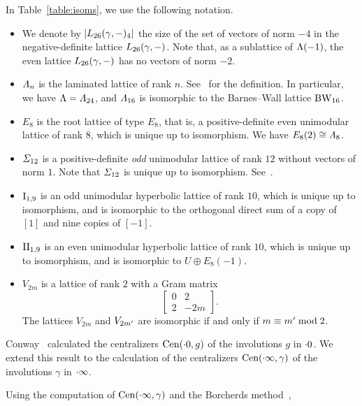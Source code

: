 \documentclass{amsart} %
\begin{document}
%
In Table~\ref{table:isoms}, we use the following notation.
\begin{itemize}
\item
We denote by $|L_{26}(\gamma, -)_4|$
the size of the set of vectors of norm $-4$ in the negative-definite lattice $L_{26}(\gamma, -)$.
Note that, as a sublattice of $\Lambda(-1)$, 
the even lattice $L_{26}(\gamma, -)$ has no vectors of norm $-2$.
\item 
$\varLambda_{n} $ is 
the laminated lattice of rank $n$. 
See~\cite[Chapter 6]{theCSbook} for the definition.
In particular, we have $\Lambda=\varLambda_{24}$, 
and  $\varLambda_{16}$ is isomorphic to the Barnes--Wall lattice $\mathrm{BW}_{16}$.
\item $E_8$ is the root lattice of type $E_8$, that is,
a positive-definite even unimodular lattice of rank $8$,
which is unique up to isomorphism.
We have $E_8(2)\cong \varLambda_{8}$.
\item $\varSigma_{12}$ is 
a positive-definite \emph{odd} unimodular lattice of rank $12$
without vectors of norm $1$.
Note that $\varSigma_{12}$ is unique up to isomorphism.
See~\cite[Table 16.7]{theCSbook}.
\item $\mathrm{I}_{1,9}$ is an odd unimodular hyperbolic lattice of rank $10$, 
which is unique up to isomorphism,
and is isomorphic to the orthogonal direct sum of
 a copy of $[1]$ and nine copies of $[-1]$.
 \item $\mathrm{II}_{1,9}$ is an even unimodular hyperbolic lattice of rank $10$,
 which is unique up to isomorphism,
 and is isomorphic to $U\oplus E_8(-1)$.
\item $V_{2m}$ is a lattice of rank $2$
with a Gram matrix 
%
\begin{equation}\label{eq:GramVm}
\left[\begin{array}{cc} 0&2 \\ 2 & -2m \end{array}\right].
\end{equation}
%
The lattices $V_{2m}$ and $V_{2m^{\prime}}$ are isomorphic 
if and only if $m\equiv m^{\prime} \bmod 2$.
\end{itemize}
%
\par
\medskip
Conway~\cite[Chapter 10]{theCSbook} calculated the centralizers $\mathrm{Cen}(\cdot 0, g)$
of the involutions $g$ in $\cdot 0$.
We extend this result to the calculation of the centralizers $\mathrm{Cen}(\cdot \infty, \gamma)$
of the involutions $\gamma$ in $\cdot \infty$.
\par
Using the computation of $\mathrm{Cen}(\cdot \infty, \gamma)$
and the Borcherds method~\cite{MR913200, MR1654763},
\end{document}
